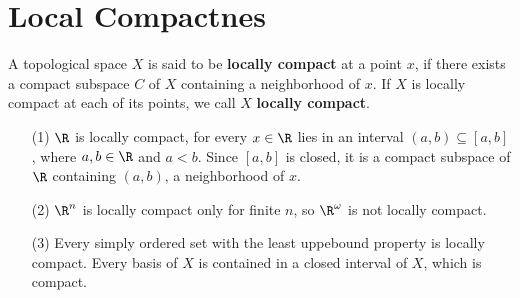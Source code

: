 \section{Local Compactnes}

\begin{definition}
    A topological space $X$ is said to be  \textbf{locally compact} at a point
    $x$, if there exists a compact subspace $C$ of $X$ containing a neighborhood
    of $x$. If  $X$ is locally compact at each of its points, we call $X$
    \textbf{locally compact}.
\end{definition}

\begin{example}\label{3.12}
    \begin{enumerate}
        \item[(1)] $\R$ is locally compact, for every  $x \in \R$ lies in an
            interval  $(a,b) \subseteq [a,b]$, where $a,b \in \R$ and  $a<b$.
            Since  $[a,b]$ is closed, it is a compact subspace of $\R$
            containing  $(a,b)$, a neighborhood of $x$.

        \item[(2)] $\R^n$ is locally compact only for finite  $n$, so
            $\R^\omega$ is not locally compact.

        \item[(3)] Every simply ordered set with the least uppebound property is
            locally compact. Every basis of $X$ is contained in a closed
            interval of  $X$, which is compact.
    \end{enumerate}
\end{example}

